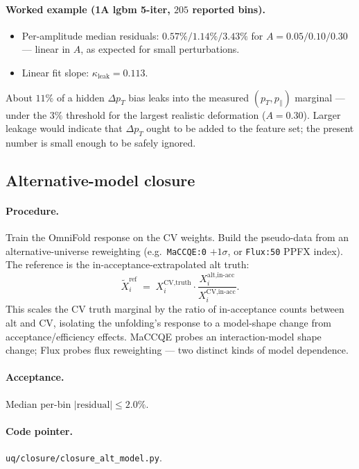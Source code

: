 \documentclass[12pt]{article}
\newcommand{\pT}{p_{T}}
\newcommand{\pPar}{p_{\parallel}}
\newcommand{\dpT}{\Delta\pT}
\newcommand{\CV}{\text{CV}}
\begin{document}
\paragraph{Worked example (1A lgbm 5-iter, $205$ reported bins).}
\begin{itemize}[nosep]
  \item Per-amplitude median residuals: $0.57\% / 1.14\% / 3.43\%$
        for $A = 0.05/0.10/0.30$ --- linear in $A$, as expected for
        small perturbations.
  \item Linear fit slope: $\kappa_{\text{leak}} = \boxed{0.113}$.
\end{itemize}
About $11\%$ of a hidden $\dpT$ bias leaks into the measured
$(\pT,\pPar)$ marginal --- under the $3\%$ threshold for the largest
realistic deformation ($A=0.30$). Larger leakage would indicate that
$\dpT$ ought to be added to the feature set; the present number is
small enough to be safely ignored.

\subsection{Alternative-model closure}
\label{sec:closure-alt}

\paragraph{Procedure.}
Train the OmniFold response on the CV weights. Build the pseudo-data
from an alternative-universe reweighting (e.g.\ \texttt{MaCCQE:0}
$+1\sigma$, or \texttt{Flux:50} PPFX index). The reference is the
in-acceptance-extrapolated alt truth:
\begin{equation}
\tilde X^{\text{ref}}_{i}
\;=\;
X^{\CV,\text{truth}}_{i}\cdot
\frac{X^{\text{alt},\text{in-acc}}_{i}}{X^{\CV,\text{in-acc}}_{i}}.
\end{equation}
This scales the CV truth marginal by the ratio of in-acceptance
counts between alt and CV, isolating the unfolding's response to
a model-shape change from acceptance/efficiency effects. MaCCQE
probes an interaction-model shape change; Flux probes flux
reweighting --- two distinct kinds of model dependence.

\paragraph{Acceptance.}
Median per-bin $|\text{residual}| \le 2.0\%$.

\paragraph{Code pointer.}
\texttt{uq/closure/closure\_alt\_model.py}.
\end{document}
